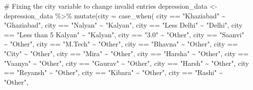 \documentclass[
  letterpaper,
  DIV=11,
  numbers=noendperiod]{scrartcl}
\newenvironment{Shaded}{\begin{snugshade}}{\end{snugshade}}
\newcommand{\AttributeTok}[1]{\textcolor[rgb]{0.40,0.45,0.13}{#1}}
\newcommand{\CommentTok}[1]{\textcolor[rgb]{0.37,0.37,0.37}{#1}}
\newcommand{\FunctionTok}[1]{\textcolor[rgb]{0.28,0.35,0.67}{#1}}
\newcommand{\NormalTok}[1]{\textcolor[rgb]{0.00,0.23,0.31}{#1}}
\newcommand{\OtherTok}[1]{\textcolor[rgb]{0.00,0.23,0.31}{#1}}
\newcommand{\SpecialCharTok}[1]{\textcolor[rgb]{0.37,0.37,0.37}{#1}}
\newcommand{\StringTok}[1]{\textcolor[rgb]{0.13,0.47,0.30}{#1}}
\begin{document}
\begin{Shaded}
\begin{Highlighting}[numbers=left,,]
\CommentTok{\# Fixing the \textasciigrave{}city\textasciigrave{} variable to change invalid entries}
\NormalTok{depression\_data }\OtherTok{\textless{}{-}}\NormalTok{ depression\_data }\SpecialCharTok{\%\textgreater{}\%}
  \FunctionTok{mutate}\NormalTok{(}\AttributeTok{city =} \FunctionTok{case\_when}\NormalTok{(}
\NormalTok{    city }\SpecialCharTok{==} \StringTok{"Khaziabad"} \SpecialCharTok{\textasciitilde{}} \StringTok{"Ghaziabad"}\NormalTok{,}
\NormalTok{    city }\SpecialCharTok{==} \StringTok{"Nalyan"} \SpecialCharTok{\textasciitilde{}} \StringTok{"Kalyan"}\NormalTok{,}
\NormalTok{    city }\SpecialCharTok{==} \StringTok{"\textquotesingle{}Less Delhi\textquotesingle{}"} \SpecialCharTok{\textasciitilde{}} \StringTok{"Delhi"}\NormalTok{,}
\NormalTok{    city }\SpecialCharTok{==} \StringTok{"\textquotesingle{}Less than 5 Kalyan\textquotesingle{}"} \SpecialCharTok{\textasciitilde{}} \StringTok{"Kalyan"}\NormalTok{,}
\NormalTok{    city }\SpecialCharTok{==} \StringTok{"3.0"} \SpecialCharTok{\textasciitilde{}} \StringTok{"Other"}\NormalTok{,}
\NormalTok{    city }\SpecialCharTok{==} \StringTok{"Saanvi"} \SpecialCharTok{\textasciitilde{}} \StringTok{"Other"}\NormalTok{,}
\NormalTok{    city }\SpecialCharTok{==} \StringTok{"M.Tech"} \SpecialCharTok{\textasciitilde{}} \StringTok{"Other"}\NormalTok{,}
\NormalTok{    city }\SpecialCharTok{==} \StringTok{"Bhavna"} \SpecialCharTok{\textasciitilde{}} \StringTok{"Other"}\NormalTok{,}
\NormalTok{    city }\SpecialCharTok{==} \StringTok{"City"} \SpecialCharTok{\textasciitilde{}} \StringTok{"Other"}\NormalTok{,}
\NormalTok{    city }\SpecialCharTok{==} \StringTok{"Mira"} \SpecialCharTok{\textasciitilde{}} \StringTok{"Other"}\NormalTok{,}
\NormalTok{    city }\SpecialCharTok{==} \StringTok{"Harsha"} \SpecialCharTok{\textasciitilde{}} \StringTok{"Other"}\NormalTok{,}
\NormalTok{    city }\SpecialCharTok{==} \StringTok{"Vaanya"} \SpecialCharTok{\textasciitilde{}} \StringTok{"Other"}\NormalTok{,}
\NormalTok{    city }\SpecialCharTok{==} \StringTok{"Gaurav"} \SpecialCharTok{\textasciitilde{}} \StringTok{"Other"}\NormalTok{,}
\NormalTok{    city }\SpecialCharTok{==} \StringTok{"Harsh"} \SpecialCharTok{\textasciitilde{}} \StringTok{"Other"}\NormalTok{,}
\NormalTok{    city }\SpecialCharTok{==} \StringTok{"Reyansh"} \SpecialCharTok{\textasciitilde{}} \StringTok{"Other"}\NormalTok{,}
\NormalTok{    city }\SpecialCharTok{==} \StringTok{"Kibara"} \SpecialCharTok{\textasciitilde{}} \StringTok{"Other"}\NormalTok{,}
\NormalTok{    city }\SpecialCharTok{==} \StringTok{"Rashi"} \SpecialCharTok{\textasciitilde{}} \StringTok{"Other"}\NormalTok{,}

\end{Highlighting}
\end{Shaded}
\end{document}
